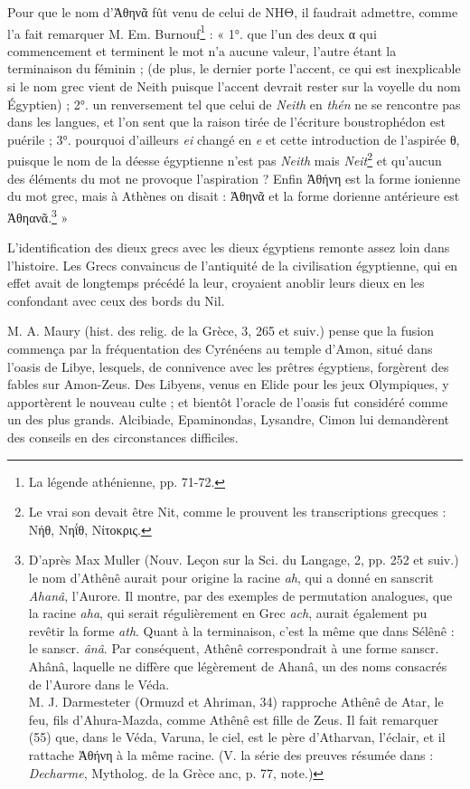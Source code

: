 \documentclass[letterpaper,twocolumn,openany,nodeprecatedcode]{dndbook}
\begin{document}
Pour que le nom d'Ἀθηνᾶ fût venu de celui de ΝΗΘ, il faudrait admettre, comme l'a fait remarquer M. Em. Burnouf\footnote{La légende athénienne, pp. 71-72.} : « 1°. que l'un des deux α qui commencement et terminent le mot n'a aucune valeur, l'autre étant la terminaison du féminin ; (de plus, le dernier porte l'accent, ce qui est inexplicable si le nom grec vient de Neith puisque l'accent devrait rester sur la voyelle du nom Égyptien) ; 2°. un renversement tel que celui de \emph{Neith} en \emph{thén} ne se rencontre pas dans les langues, et l'on sent que la raison tirée de l'écriture boustrophédon est puérile ; 3°. pourquoi d'ailleurs \emph{ei} changé en \emph{e} et cette introduction de l'aspirée θ, puisque le nom de la déesse égyptienne n'est pas \emph{Neith} mais \emph{Neit}\footnote{Le vrai son devait être Nit, comme le prouvent les transcriptions grecques : Νήθ, Νηΐθ, Νίτοκρις.} et qu'aucun des éléments du mot ne provoque l'aspiration ? Enfin Ἀθήνη est la forme ionienne du mot grec, mais à Athènes on disait : Ἀθηνᾶ et la forme dorienne antérieure est Ἀθηανᾶ.\footnote{D'après Max Muller (Nouv. Leçon sur la Sci. du Langage, 2, pp. 252 et suiv.) le nom d'Athênê aurait pour origine la racine \emph{ah}, qui a donné en sanscrit \emph{Ahanâ}, l'Aurore. Il montre, par des exemples de permutation analogues, que la racine \emph{aha}, qui serait régulièrement en Grec \emph{ach}, aurait également pu revêtir la forme \emph{ath}. Quant à la terminaison, c'est la même que dans Sélênê : le sanscr. \emph{ânâ}. Par conséquent, Athênê correspondrait à une forme sanscr. Ahânâ, laquelle ne diffère que légèrement de Ahanâ, un des noms consacrés de l'Aurore dans le Véda.\\\hspace*{5mm}M. J. Darmesteter (Ormuzd et Ahriman, 34) rapproche Athênê de Atar, le feu, fils d'Ahura-Mazda, comme Athênê est fille de Zeus. Il fait remarquer (55) que, dans le Véda, Varuna, le ciel, est le père d'Atharvan, l'éclair, et il rattache Ἀθήνη à la même racine. (V. la série des preuves résumée dans : \emph{Decharme}, Mytholog. de la Grèce anc, p. 77, note.)} »

L'identification des dieux grecs avec les dieux égyptiens remonte assez loin dans l'histoire. Les Grecs convaincus de l'antiquité de la civilisation égyptienne, qui en effet avait de longtemps précédé la leur, croyaient anoblir leurs dieux en les confondant avec ceux des bords du Nil.

M. A. Maury (hist. des relig. de la Grèce, 3, 265 et suiv.) pense que la fusion commença par la fréquentation des Cyrénéens au temple d'Amon, situé dans l'oasis de Libye, lesquels, de connivence avec les prêtres égyptiens, forgèrent des fables sur Amon-Zeus. Des Libyens, venus en Elide pour les jeux Olympiques, y apportèrent le nouveau culte ; et bientôt l'oracle de l'oasis fut considéré comme un des plus grands. Alcibiade, Epaminondas, Lysandre, Cimon lui demandèrent des conseils en des circonstances difficiles.
\end{document}
